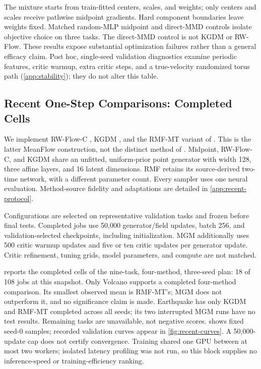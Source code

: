 


The mixture starts from train-fitted centers, scales, and weights; only centers and scales receive pathwise midpoint gradients. Hard component boundaries leave weights fixed. Matched random-MLP midpoint and direct-MMD controls isolate objective choice on three tasks. The direct-MMD control is not KGDM or RW-Flow. These results expose substantial optimization failures rather than a general efficacy claim. Post hoc, single-seed validation diagnostics examine periodic features, critic warmup, extra critic steps, and a true-velocity randomized torus path (\cref{app:stability}); they do not alter this table.

\subsection{Recent One-Step Comparisons: Completed Cells}
\label{sec:recent}
We implement RW-Flow-C \citep{nurgulan2026rwflow}, KGDM \citep{estebancasadevall2026kgdm}, and the RMF-MT variant of \citet{zhong2026rmf}. This is the latter MeanFlow construction, not the distinct method of \citet{woo2026rmf}. Midpoint, RW-Flow-C, and KGDM share an unfitted, uniform-prior point generator with width 128, three affine layers, and 16 latent dimensions. RMF retains its source-derived two-time network, with a different parameter count. Every sampler uses one neural evaluation. Method-source fidelity and adaptations are detailed in \cref{app:recent-protocol}.

Configurations are selected on representative validation tasks and frozen before final tests. Completed jobs use 50,000 generator/field updates, batch 256, and validation-selected checkpoints, including initialization. MGM additionally uses 500 critic warmup updates and five or ten critic updates per generator update. Critic refinement, tuning grids, model parameters, and compute are not matched.


 reports the completed cells of the nine-task, four-method, three-seed plan: 18 of 108 jobs at this snapshot. Only Volcano supports a completed four-method comparison. Its smallest observed mean is RMF-MT's; MGM does not outperform it, and no significance claim is made. Earthquake has only KGDM and RMF-MT completed across all seeds; its two interrupted MGM runs have no test results. Remaining tasks are unavailable, not negative scores.  shows fixed seed-0 samples; recorded validation curves appear in \cref{fig:recent-curves}. A 50,000-update cap does not certify convergence. Training shared one GPU between at most two workers; isolated latency profiling was not run, so this block supplies no inference-speed or training-efficiency ranking.

